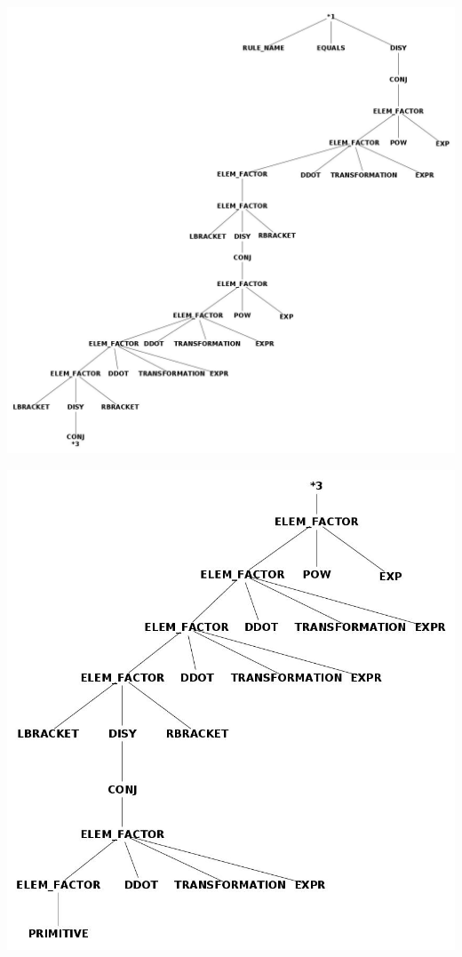 \centerline{\includegraphics[scale=0.40]{arboles_derivacion/cube1.jpg}}

\centerline{\includegraphics[scale=0.40]{arboles_derivacion/cube1b.jpg}}

